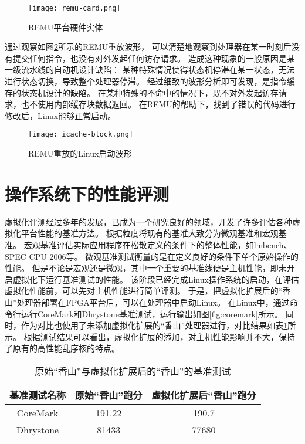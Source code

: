 \begin{figure}[htbp]
    \centering
\texttt{[image: remu-card.png]}
    \caption{REMU平台硬件实体}
    \label{fig:remu-card}
\end{figure}

通过观察如图\ref{fig:console-block-wave}所示的REMU重放波形，
可以清楚地观察到处理器在某一时刻后没有提交任何指令，也没有对外发起任何访存请求。
造成这种现象的一般原因是某一级流水线的自动机设计缺陷：
某种特殊情况使得状态机停滞在某一状态，无法进行状态切换，导致整个处理器停滞。
经过细致的波形分析即可发现，是指令缓存的状态机设计的缺陷。
在某种特殊的不命中的情况下，既不对外发起访存请求，也不使用内部缓存块数据返回。
在REMU的帮助下，找到了错误的代码进行修改后，Linux能够正常启动。

\begin{figure}[htbp]
    \centering
\texttt{[image: icache-block.png]}
    \caption{REMU重放的Linux启动波形}
    \label{fig:console-block-wave}
\end{figure}

\section{操作系统下的性能评测}
虚拟化评测经过多年的发展，已成为一个研究良好的领域，开发了许多评估各种虚拟化平台性能的基准方法。
根据粒度将现有的基准大致分为微观基准和宏观基准。
宏观基准评估实际应用程序在松散定义的条件下的整体性能，如lmbench、SPEC CPU 2006等。
微观基准测试衡量的是在定义良好的条件下单个原始操作的性能。
但是不论是宏观还是微观，其中一个重要的基准线便是主机性能，即未开启虚拟化下运行基准测试的性能。
该阶段已经完成Linux操作系统的启动，在评估虚拟化性能前，可以先对主机性能进行简单评测。
于是，把虚拟化扩展后的“香山”处理器部署在FPGA平台后，可以在处理器中启动Linux。
在Linux中，通过命令行运行CoreMark和Dhrystone基准测试，运行输出如图\ref{fig:coremark}所示。
同时，作为对比也使用了未添加虚拟化扩展的“香山”处理器进行，对比结果如表\ref{tab:perf}所示。
根据测试结果可以看出，虚拟化扩展的添加，对主机性能影响并不大，保持了原有的高性能乱序核的特点。

\begin{table}
    \centering
    \caption{原始“香山”与虚拟化扩展后的“香山”的基准测试}
    \begin{tabular}{ccc}
        \toprule
        基准测试名称   & 原始“香山”跑分 & 虚拟化扩展后“香山”跑分 \\
        \midrule
        CoreMark & 191.22   & 190.7        \\
Dhrystone & 81433   & 77680        \\
        \bottomrule
    \end{tabular}
    \label{tab:perf}
\end{table}


